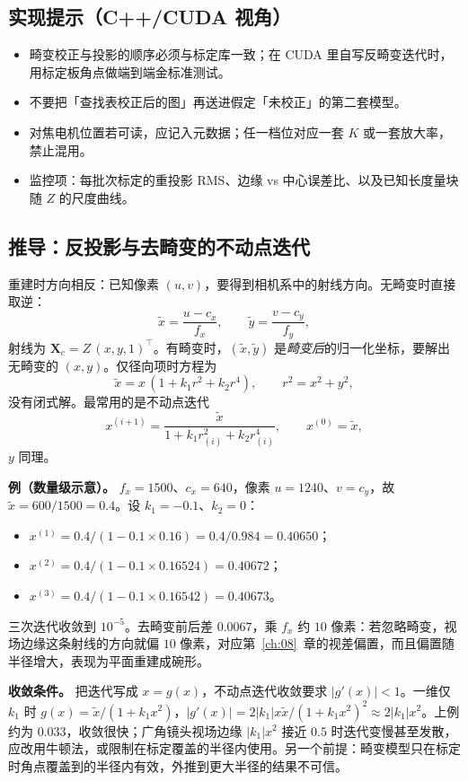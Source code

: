 \subsection{实现提示（C++/CUDA 视角）}

\begin{itemize}
  \item 畸变校正与投影的顺序必须与标定库一致；在 CUDA 里自写反畸变迭代时，用标定板角点做端到端金标准测试。
  \item 不要把「查找表校正后的图」再送进假定「未校正」的第二套模型。
  \item 对焦电机位置若可读，应记入元数据；任一档位对应一套 $K$ 或一套放大率，禁止混用。
  \item 监控项：每批次标定的重投影 RMS、边缘 vs 中心误差比、以及已知长度量块随 $Z$ 的尺度曲线。
\end{itemize}

\subsection{推导：反投影与去畸变的不动点迭代}

重建时方向相反：已知像素 $(u,v)$，要得到相机系中的射线方向。无畸变时直接取逆：
\[
  \tilde{x}=\frac{u-c_x}{f_x},\qquad \tilde{y}=\frac{v-c_y}{f_y},
\]
射线为 $\mathbf{X}_c=Z\,(x,y,1)^\top$。有畸变时，$(\tilde{x},\tilde{y})$ 是\emph{畸变后}的归一化坐标，要解出无畸变的 $(x,y)$。仅径向项时方程为
\[
  \tilde{x}=x\,(1+k_1r^2+k_2r^4),\qquad r^2=x^2+y^2,
\]
没有闭式解。最常用的是不动点迭代
\[
  x^{(i+1)}=\frac{\tilde{x}}{1+k_1r_{(i)}^2+k_2r_{(i)}^4},\qquad x^{(0)}=\tilde{x},
\]
$y$ 同理。

\textbf{例（数量级示意）。} $f_x=1500$、$c_x=640$，像素 $u=1240$、$v=c_y$，故 $\tilde{x}=600/1500=0.4$。设 $k_1=-0.1$、$k_2=0$：
\begin{itemize}
  \item $x^{(1)}=0.4/(1-0.1\times0.16)=0.4/0.984=0.40650$；
  \item $x^{(2)}=0.4/(1-0.1\times0.16524)=0.40672$；
  \item $x^{(3)}=0.4/(1-0.1\times0.16542)=0.40673$。
\end{itemize}
三次迭代收敛到 $10^{-5}$。去畸变前后差 $0.0067$，乘 $f_x$ 约 $10$ 像素：若忽略畸变，视场边缘这条射线的方向就偏 $10$ 像素，对应第~\ref{ch:08}~章的视差偏置，而且偏置随半径增大，表现为平面重建成碗形。

\textbf{收敛条件。} 把迭代写成 $x=g(x)$，不动点迭代收敛要求 $|g'(x)|<1$。一维仅 $k_1$ 时 $g(x)=\tilde{x}/(1+k_1x^2)$，$|g'(x)|=2|k_1|x\tilde{x}/(1+k_1x^2)^2\approx2|k_1|x^2$。上例约为 $0.033$，收敛很快；广角镜头视场边缘 $|k_1|x^2$ 接近 $0.5$ 时迭代变慢甚至发散，应改用牛顿法，或限制在标定覆盖的半径内使用。另一个前提：畸变模型只在标定时角点覆盖到的半径内有效，外推到更大半径的结果不可信。

